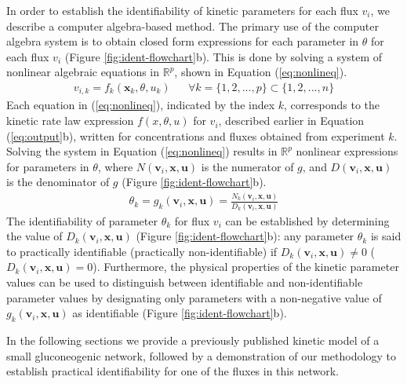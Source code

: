 \documentclass[10pt]{article}
\begin{document}
In order to establish the identifiability of kinetic parameters for each flux $v_i$, we describe a computer algebra-based method. The primary use of the computer algebra system is to obtain closed form expressions for each parameter in $\theta$ for each flux $v_i$ (Figure \ref{fig:ident-flowchart}b). This is done by solving a system of nonlinear algebraic equations in $\mathbb{R}^p$, shown in Equation (\ref{eq:nonlineq}).
\begin{align}\label{eq:nonlineq}
v_{i, k} = f_k(\mathbf{x}_k,\theta, u_k) && \forall k=\{1, 2, ..., p\}\subset\{1, 2, ..., n\}
\end{align}
Each equation in (\ref{eq:nonlineq}), indicated by the index $k$, corresponds to the kinetic rate law expression $f(x, \theta, u)$ for $v_i$, described earlier in Equation (\ref{eq:output}b), written for concentrations and fluxes obtained from experiment $k$. Solving the system in Equation (\ref{eq:nonlineq}) results in $\mathbb{R}^p$ nonlinear expressions for parameters in $\theta$, where $N(\mathbf{v}_i, \mathbf{x}, \mathbf{u})$ is the numerator of $g$, and $D(\mathbf{v}_i, \mathbf{x}, \mathbf{u})$ is the denominator of $g$ (Figure \ref{fig:ident-flowchart}b).
\begin{align}\label{eq:theta-eq}
\theta_k = g_k(\mathbf{v}_i, \mathbf{x}, \mathbf{u}) = \frac{N_k(\mathbf{v}_i, \mathbf{x}, \mathbf{u})}{D_k(\mathbf{v}_i, \mathbf{x}, \mathbf{u})}
\end{align}
The identifiability of parameter $\theta_k$ for flux $v_i$ can be established by determining the value of $D_k(\mathbf{v}_i, \mathbf{x}, \mathbf{u})$ (Figure \ref{fig:ident-flowchart}b): any parameter $\theta_k$ is said to practically identifiable (practically non-identifiable) if $D_k(\mathbf{v}_i, \mathbf{x}, \mathbf{u})\neq0$ ($D_k(\mathbf{v}_i, \mathbf{x}, \mathbf{u}) = 0$). Furthermore, the physical properties of the kinetic parameter values can be used to distinguish between identifiable and non-identifiable parameter values by designating only parameters with a non-negative value of $g_k(\mathbf{v}_i, \mathbf{x}, \mathbf{u})$ as identifiable (Figure \ref{fig:ident-flowchart}b).

In the following sections we provide a previously published kinetic model of a small gluconeogenic network, followed by a demonstration of our methodology to establish practical identifiability for one of the fluxes in this network.
\end{document}
